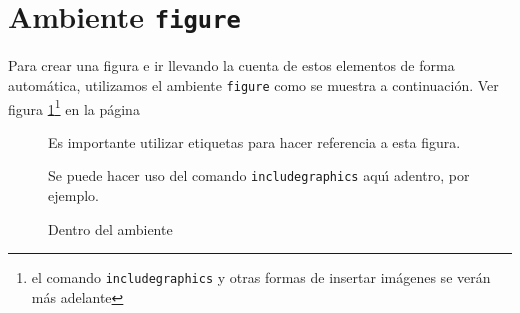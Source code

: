 %
%

\section{Ambiente \texttt{figure}}

Para crear una figura e ir llevando la cuenta de estos elementos de
forma autom\'atica, utilizamos el ambiente \texttt{figure} como se
muestra a continuaci\'on. Ver figura \ref{mi:figura}\footnote{el
  comando \texttt{includegraphics} y otras formas de insertar
  im\'agenes se ver\'an m\'as adelante} en la p\'agina
\pageref{mi:figura}

\begin{figure}

  \begin{center}
    Es importante utilizar etiquetas para hacer referencia a esta
    figura.

    Se puede hacer uso del comando \texttt{includegraphics} aqu\'{\i}
    adentro, por ejemplo.

    \caption{Dentro del ambiente}\label{mi:figura}

  \end{center}
\end{figure}
